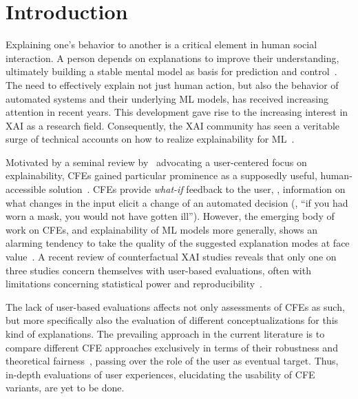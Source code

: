 \section{Introduction}\label{sec:introduction}

Explaining one's behavior to another is a critical element in human social interaction. 
A person depends on explanations to improve their understanding, ultimately building a stable mental model as basis for prediction and control~\citep{heider_psychology_1958}. 
The need to effectively explain not just human action, but also the behavior of automated systems and their underlying \gls{ML} models, has received increasing attention in recent years. This development gave rise to the increasing interest in \gls{XAI} as a research field. 
Consequently, the \gls{XAI} community has seen a veritable surge of technical accounts on how to realize explainability for \gls{ML}~\citep{guidotti_survey_2019}. 

Motivated by a seminal review by~\citeauthor{miller_explanation_2019} advocating a user-centered focus on explainability, \glspl{CFE} gained particular prominence as a supposedly useful, human-accessible solution~\citep{miller_explanation_2019,keane_if_2021}.
\glspl{CFE} provide \textit{what-if} feedback to the user, \ie, information on what changes in the input elicit a change of an automated decision (\ie, ``if you had worn a mask, you would not have gotten ill''). %
However, the emerging body of work on \glspl{CFE}, and explainability of \gls{ML} models more generally, shows an alarming tendency to take the quality of the suggested explanation modes at face value~\citep{doshi-velez_towards_2017, offert_i_2017}.
A recent review of counterfactual \gls{XAI} studies reveals that only one on three studies concern themselves with user-based evaluations, often with limitations concerning statistical power and reproducibility~\citep{keane_if_2021}.

The lack of user-based evaluations affects not only assessments of \glspl{CFE} as such, but more specifically also the evaluation of different conceptualizations for this kind of explanations.
The prevailing approach in the current literature is to compare different \gls{CFE} approaches exclusively in terms of their robustness and theoretical fairness~\citep{artelt_evaluating_2021, de_oliveira_framework_2021, white_measurable_2020}, passing over the role of the user as eventual target.  
Thus, in-depth evaluations of user experiences, elucidating the usability of \gls{CFE} variants, are yet to be done.

